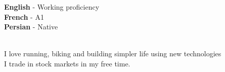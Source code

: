 \documentclass[9pt]{developercv}
\begin{document}
\begin{minipage}[t]{0.45\textwidth}
	\vspace{-\baselineskip} %


	\textbf{English} - Working proficiency\\
	\textbf{French} - A1\\
	\textbf{Persian} - Native\\\
\end{minipage}
\hfill
\begin{minipage}[t]{0.45\textwidth}
	\vspace{-\baselineskip} %


	I love running, biking and building simpler life using new technologies\\
	I trade in stock markets in my free time.
\end{minipage}
\end{document}
